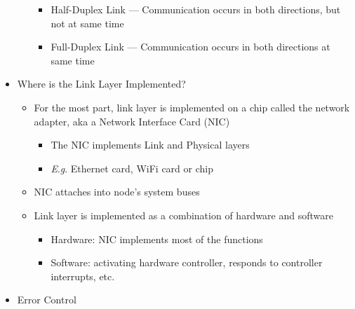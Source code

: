 \begin{itemize}
\begin{itemize}
\begin{itemize}
          \item Half-Duplex Link — Communication occurs in both directions, but not at same time

          \item Full-Duplex Link — Communication occurs in both directions at same time

        \end{itemize}

    \end{itemize}

  \item Where is the Link Layer Implemented?

    \begin{itemize}

      \item For the most part, link layer is implemented on a chip called the network adapter, aka a Network Interface Card (NIC)

        \begin{itemize}

          \item The NIC implements Link and Physical layers

          \item \textit{E}.\textit{g}. Ethernet card,  WiFi card or chip

        \end{itemize}

      \item NIC attaches into node’s system buses

      \item Link layer is implemented as a combination of hardware and software

        \begin{itemize}

          \item Hardware: NIC implements most of the functions

          \item Software: activating hardware controller, responds to controller interrupts, etc.

        \end{itemize}

    \end{itemize}

  \item Error Control

    \begin{itemize}


\end{itemize}
\end{itemize}
